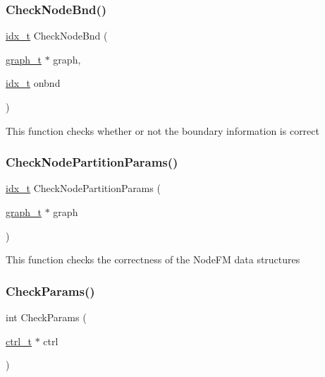 \subsubsection{\texorpdfstring{Check\+Node\+Bnd()}{CheckNodeBnd()}}
{\footnotesize\ttfamily \hyperlink{a00876_aaa5262be3e700770163401acb0150f52}{idx\+\_\+t} Check\+Node\+Bnd (\begin{DoxyParamCaption}\item[{\hyperlink{a00734}{graph\+\_\+t} $\ast$}]{graph,  }\item[{\hyperlink{a00876_aaa5262be3e700770163401acb0150f52}{idx\+\_\+t}}]{onbnd }\end{DoxyParamCaption})}

This function checks whether or not the boundary information is correct \mbox{\label{a00945_a83201bd720c3e6b74bf0898580a1f1dc}} 
\subsubsection{\texorpdfstring{Check\+Node\+Partition\+Params()}{CheckNodePartitionParams()}}
{\footnotesize\ttfamily \hyperlink{a00876_aaa5262be3e700770163401acb0150f52}{idx\+\_\+t} Check\+Node\+Partition\+Params (\begin{DoxyParamCaption}\item[{\hyperlink{a00734}{graph\+\_\+t} $\ast$}]{graph }\end{DoxyParamCaption})}

This function checks the correctness of the Node\+FM data structures \mbox{\label{a00945_a279ffe27d8412909f9117b5ca4721dce}} 
\subsubsection{\texorpdfstring{Check\+Params()}{CheckParams()}}
{\footnotesize\ttfamily int Check\+Params (\begin{DoxyParamCaption}\item[{\hyperlink{a00742}{ctrl\+\_\+t} $\ast$}]{ctrl }\end{DoxyParamCaption})}

